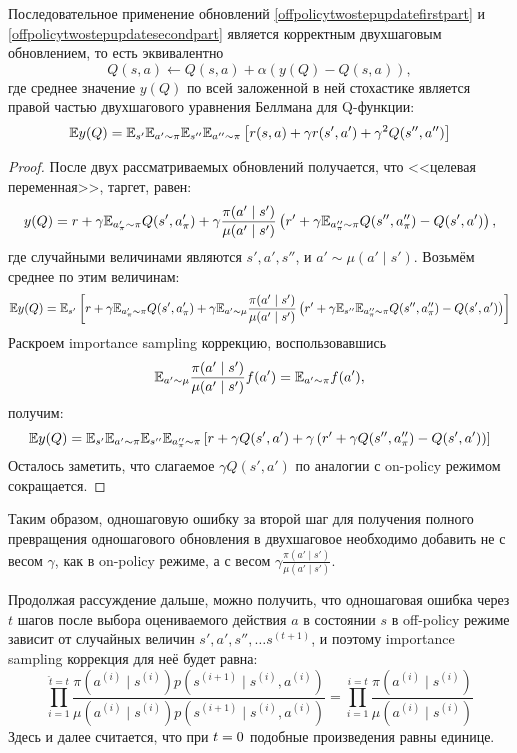 \begin{proposition}
Последовательное применение обновлений \eqref{offpolicytwostepupdatefirstpart} и \eqref{offpolicytwostepupdatesecondpart} является корректным двухшаговым обновлением, то есть эквивалентно
$$Q(s, a) \leftarrow Q(s, a) + \alpha (y(Q) - Q(s, a)),$$
где среднее значение $y(Q)$ по всей заложенной в ней стохастике является правой частью двухшагового уравнения Беллмана для Q-функции:
$$\mathbb{E} y(Q) = \mathbb{E}_{s'}\mathbb{E}_{a' \sim \pi} \mathbb{E}_{s''}\mathbb{E}_{a'' \sim \pi} \left[ r(s, a) + \gamma r(s', a') + \gamma^2 Q(s'', a'') \right]$$
\begin{proof}
После двух рассматриваемых обновлений получается, что <<целевая переменная>>, таргет, равен:
$$y(Q) = r + \gamma \mathbb{E}_{a'_\pi \sim \pi} Q(s', a'_\pi) + \gamma \frac{\pi(a' \mid s')}{\mu(a' \mid s')} \left( r' + \gamma \mathbb{E}_{a''_\pi \sim \pi} Q(s'', a''_\pi) - Q(s', a') \right),$$
где случайными величинами являются $s', a', s''$, и $a' \sim \mu(a' \mid s')$. Возьмём среднее по этим величинам:
$$\mathbb{E} y(Q) = \mathbb{E}_{s'} \left[ r + \gamma \mathbb{E}_{a'_\pi \sim \pi} Q(s', a'_\pi) + \gamma \mathbb{E}_{a' \sim \mu} \frac{\pi(a' \mid s')}{\mu(a' \mid s')} \left( r' + \gamma \mathbb{E}_{s''} \mathbb{E}_{a''_\pi \sim \pi} Q(s'', a''_\pi) - Q(s', a') \right) \right]$$
Раскроем importance sampling коррекцию, воспользовавшись
$$\mathbb{E}_{a' \sim \mu} \frac{\pi(a' \mid s')}{\mu(a' \mid s')} f(a') = \mathbb{E}_{a' \sim \pi} f(a'),$$
получим:
$$\mathbb{E} y(Q) = \mathbb{E}_{s'} \mathbb{E}_{a' \sim \pi} \mathbb{E}_{s''} \mathbb{E}_{a''_\pi \sim \pi} \left[ r + \gamma Q(s', a') + \gamma \left( r' + \gamma  Q(s'', a''_\pi) - Q(s', a') \right) \right]$$
Осталось заметить, что слагаемое $\gamma Q(s', a')$ по аналогии с on-policy режимом сокращается.
\end{proof}
\end{proposition}

Таким образом, одношаговую ошибку за второй шаг для получения полного превращения одношагового обновления в двухшаговое необходимо добавить не с весом $\gamma$, как в on-policy режиме, а с весом $\gamma \frac{\pi(a' \mid s')}{\mu(a' \mid s')}$.

Продолжая рассуждение дальше, можно получить, что одношаговая ошибка через $t$ шагов после выбора оцениваемого действия $a$ в состоянии $s$ в off-policy режиме зависит от случайных величин $s', a', s'', \dots s^{(t + 1)}$, и поэтому importance sampling коррекция для неё будет равна:
$$\prod_{i = 1}^{\hat{t} = t} 
\frac{\pi(a^{(i)} \mid s^{(i)}) p(s^{(i + 1)} \mid s^{(i)}, a^{(i)})}{\mu(a^{(i)} \mid s^{(i)}) p(s^{(i + 1)} \mid s^{(i)}, a^{(i)})} = \prod_{i = 1}^{i = t} \frac{\pi(a^{(i)} \mid s^{(i)}) }{\mu(a^{(i)} \mid s^{(i)})}$$
Здесь и далее считается, что при $t \HM= 0$ подобные произведения равны единице.


